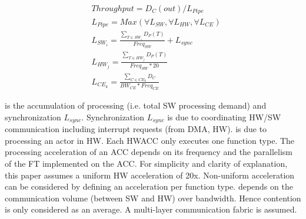 \begin{equation}
\begin{split}
	&Throughput = D_{C}(out) / L_{Pipe} \\
	&L_{Pipe} = Max (\forall L_{SW}, \forall L_{HW}, \forall L_{CE}) \\
	&L_{SW_i} = \frac{\sum_{T \in SW_i} D_{P}(T)} {Freq_{SW}} + L_{sync} \\
	&L_{HW_j} = \frac{\sum_{T \in HW_j} D_{P}(T)} {Freq_{SW}*20} \\
	&L_{CE_k} = \frac{\sum_{C \in CE_k} D_{C}} {BW_{CE} * Freq_{CE}}
\label{eq:pipe}
\end{split}
\end{equation}

  is the accumulation of processing (i.e. total SW processing demand) and synchronization $L_{sync}$. Synchronization $L_{sync}$ is due to coordinating HW/SW communication including interrupt requests (from DMA, HW).
 is due to processing an actor in HW. Each HWACC only executes one function type. 
The processing acceleration of an ACC depends on its frequency and the parallelism of the FT implemented on the ACC. For simplicity and clarity of explanation, this paper assumes a uniform HW acceleration of 20x. Non-uniform acceleration can be considered by defining an acceleration per function type.
 depends on the communication volume (between SW and HW) over bandwidth. Hence contention is only considered as an average. A multi-layer communication fabric is assumed. 
